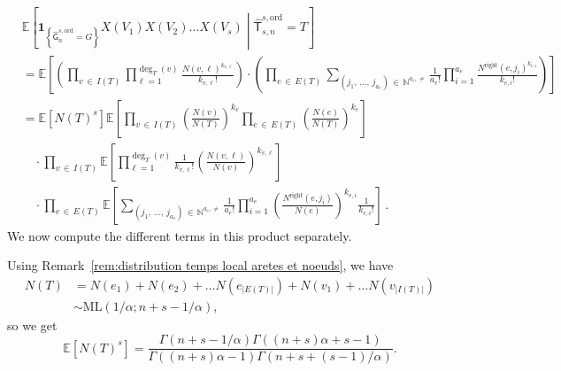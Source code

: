 \documentclass[10pt]{amsart}
\theoremstyle{definition}\newtheorem{defi}[theo]{Definition}\newtheorem{rema}[theo]{Remark}\newtheorem{exam}[theo]{Example}\newtheorem{exem}[theo]{Example}\newtheorem{nota}[theo]{Notation}
\newcommand{\Ec}[1]{\mathbb{E} \left[#1\right]}
\newcommand{\abs}[1]{\left\lvert#1\right\rvert}
\newcommand{\Ecsq}[2]{\mathbb{E} \left[#1\mathrel{}\middle|\mathrel{}#2\right]}
\newcommand{\ind}[1]{\mathbf{1}_{\left\lbrace #1 \right\rbrace}}
\newcommand{\E}[1]{\ensuremath{\mathbb{E} \left[#1 \right]}}
\newcommand{\ord}{\mathrm{ord}}
\newcommand{\ML}{\mathrm{ML}}
\newcommand{\Rightll}{\mathrm{right}}
\newcommand{\sG}{\mathsf{G}}
\newcommand{\sT}{\mathsf{T}}
\newcommand{\N}{\mathbb{N}}
\begin{document}
\begin{align*}
& \Ecsq{\ind{\widehat{\sG}_{n}^{s,\ord}=G}X(V_1)X(V_2)\dots X(V_s)}{\widehat{\sT}_{s,n}^{s,\ord}=T} \\
& = \E{\left(\prod_{v\,\in\,I(T)}\prod_{\ell=1}^{\deg_T(v)}\frac{N(v,\ell)^{k_{v,\ell}}}{k_{v,\ell}!}\right)
\cdot\left(\prod_{e\,\in\,E(T)}\sum_{\left(j_1,\,\dots,\,j_{a_e}\right)\,\in\,\N^{a_e,\neq}} \frac{1}{a_e!} \prod_{i=1}^{a_e} \frac{N^{\Rightll}\left(e,j_{i}\right)^{k_{e,i}}} {k_{e,i}!} \right)} \\
& = \E{N(T)^s} \E{\prod_{v\,\in\,I(T)} \left(\frac{N(v)}{N(T)}\right)^{k_v} \prod_{e\,\in\, E(T)} \left(\frac{N(e)}{N(T)} \right)^{k_e} }\\
&\quad\cdot\prod_{v\,\in\,I(T)} \E{\prod_{\ell=1}^{\deg_T(v)} \frac{1}{k_{v,\ell}!} \left(\frac{N(v,\ell)}{N(v)} \right)^{k_{v, \ell}} } \\
&\quad\cdot\prod_{e\,\in\,E(T)} \E{ \sum_{\left(j_1,\,\ldots,\,j_{a_e}\right)\,\in\,\N^{a_e, \neq}} \frac{1}{a_e!}\prod_{i=1}^{a_e} \left(\frac{N^{\Rightll}(e, j_i)}{N(e)}\right)^{k_{e,i}} \frac{1}{k_{e,i}!}}\,.
\end{align*}
We now compute the different terms in this product separately.

Using Remark~\ref{rem:distribution temps local aretes et noeuds}, we have
\begin{align*}
N(T)
&=N(e_1)+N(e_2)+\dots N\left(e_{\abs{E(T)}}\right)+N(v_1)+\dots N\left(v_{\abs{I(T)}}\right)\\
&\sim \ML\left(1/\alpha;n+s-1/\alpha \right),
\end{align*}
so we get
\[
\Ec{N(T)^s}= \frac{\Gamma(n+s-1/\alpha)\Gamma((n+s)\alpha +s-1)}{\Gamma((n+s)\alpha -1)\Gamma(n+s+(s-1)/\alpha)}.
\]
\end{document}
